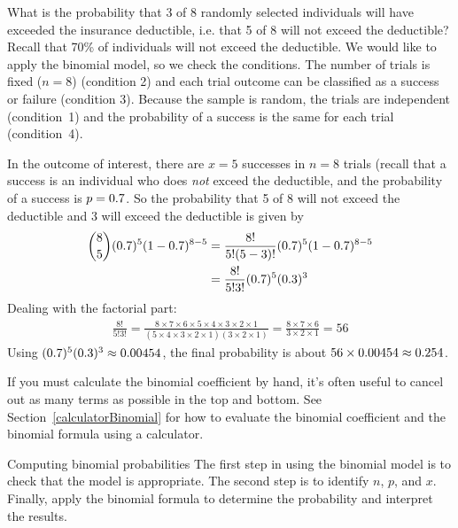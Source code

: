 \begin{examplewrap}
\begin{nexample}{What is the probability that 3 of 8 randomly
    selected individuals will have exceeded the insurance
    deductible, i.e. that 5 of 8 will not exceed the deductible?
    Recall that 70\% of individuals will not exceed the
    deductible.}
  We would like to apply the binomial model,
  so we check the conditions.
  The number of trials is fixed ($n = 8$) (condition 2)
  and each trial outcome can be classified as a success
  or failure (condition 3).
  Because the sample is random, the trials are independent
  (condition~1) and the probability of a success is the same
  for each trial (condition~4).

  In the outcome of interest, there are $x = 5$ successes
  in $n = 8$ trials (recall that a success is an individual
  who does \emph{not} exceed the deductible, and the
  probability of a success is $p = 0.7{}$.
  So the probability that 5 of 8 will not exceed the
  deductible and 3 will exceed the deductible is given by
  \begin{align*}
  { 8 \choose 5}(0.7{})^5
  (1-0.7{})^{8-5}
    &= \frac{8!}{5!(5-3)!}
        (0.7{})^5(1-0.7{})^{8-5} \\
    &= \frac{8!}{5!3!}
        (0.7{})^5(0.3{})^3
  \end{align*}
  Dealing with the factorial part:
  \begin{align*}
  \frac{8!}{5!3!}
    = \frac{8\times7\times6\times5\times4\times3\times2\times1}
        {(5\times4\times3\times2\times1)(3\times2\times1)}
    = \frac{8\times7\times6}{3\times2\times1}
    = 56
  \end{align*}
  Using $(0.7{})^5(0.3{})^3
    \approx 0.00454{}$,
  the final probability is about
  $56\times 0.00454{}
    \approx 0.254{}$.
\end{nexample}
\end{examplewrap}


  If you must calculate the binomial coefficient by hand, it's often useful
  to cancel out as many terms as possible in the top and
  bottom.  See Section~\ref{calculatorBinomial} for how to evaluate the binomial coefficient and the binomial formula using a calculator.

\begin{onebox}{Computing binomial probabilities}
  The first step in using the binomial model is to check
  that the model is appropriate.
  The second step is to identify $n$, $p$, and $x$.
  Finally, apply the binomial formula to determine the probability and interpret the results.%
  \vspace{3mm}

\end{onebox}

